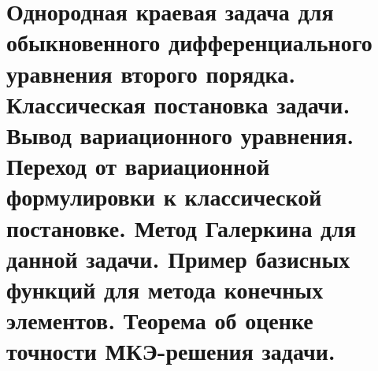 \documentclass[__main__.tex]{subfiles}
\begin{document}
\section{Однородная краевая задача для обыкновенного дифференциального уравнения второго порядка. Классическая постановка задачи. Вывод вариационного уравнения. Переход от вариационной формулировки к классической постановке. Метод Галеркина для данной задачи. Пример базисных функций для метода конечных элементов. Теорема об оценке точности МКЭ-решения задачи.}
\end{document}
